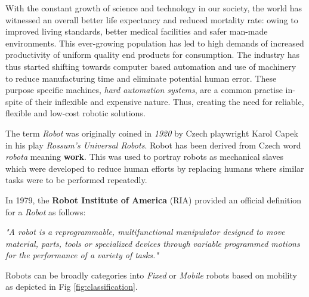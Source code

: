 \begin{spacing}{2}

With the constant growth of science and technology in our society, the world has witnessed an overall better life expectancy and reduced mortality rate: owing to improved living standards, better medical facilities and safer man-made environments. This ever-growing population has led to high demands of increased productivity of uniform quality end products for consumption. The industry has thus started shifting towards computer based automation and use of machinery to reduce manufacturing time and eliminate potential human error. These purpose specific machines, \textit{hard automation systems}, are a common practise in-spite of their inflexible and expensive nature. Thus, creating the need for reliable, flexible and low-cost robotic solutions.

The term \textit{Robot} was originally coined in \textit{1920} by Czech playwright Karol Capek in his play \textit{Rossum's Universal Robots}. Robot has been derived from Czech word \textit{robota} meaning \textbf{work}. This was used to portray robots as mechanical slaves which were developed to reduce human efforts by replacing humans where similar tasks were to be performed repeatedly.

In 1979, the \textbf{Robot Institute of America} (RIA) provided an official definition for a \textit{Robot} as follows:

\textit{"A robot is a reprogrammable, multifunctional manipulator designed to move material, parts, tools or specialized devices through variable programmed motions for the performance of a variety of tasks."}

Robots can be broadly categories into \textit{Fixed} or \textit{Mobile} robots based on mobility as depicted in Fig \ref{fig:classification}.


\end{spacing}
